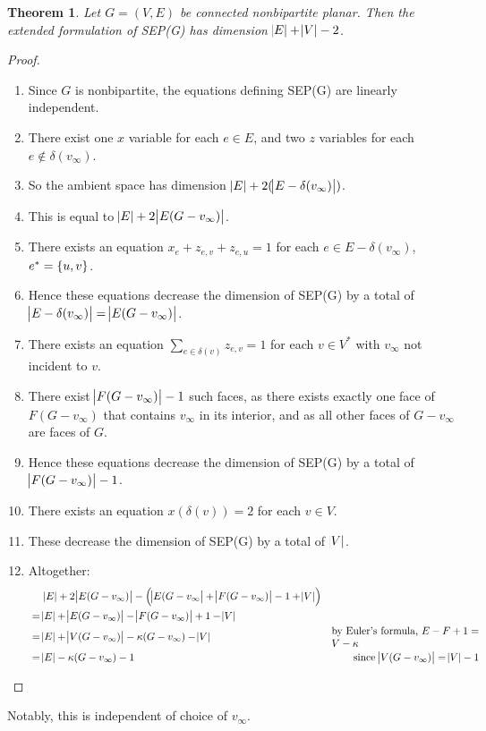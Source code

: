 \documentclass{article}
\newtheorem{theorem}{Theorem}
\begin{document}
\begin{theorem}
Let $G=(V,E)$ be connected nonbipartite planar. Then the extended formulation of SEP(G) has dimension $\abs{E}+\abs{V}-2$.
\end{theorem}
\begin{proof}
\begin{enumerate}
\item Since $G$ is nonbipartite, the equations defining SEP(G) are linearly independent.
\item There exist one $x$ variable for each $e\in E$, and two $z$ variables for each $e\not\in \delta(v_\infty)$.
\item So the ambient space has dimension $\abs{E}+2(\abs{E-\delta(v_\infty)})$.
\item This is equal to $\abs{E}+2\abs{E(G-v_\infty)}$.
\item There exists an equation $x_e+z_{e,v}+z_{e,u}=1$ for each $e\in E-\delta(v_\infty)$, $e^* = \cbr{u,v}$.
\item Hence these equations decrease the dimension of SEP(G) by a total of $\abs{E-\delta(v_\infty)} = \abs{E(G-v_\infty)}$.
\item There exists an equation $\sum_{e\in\delta(v)} z_{e,v}=1$ for each $v\in V^*$ with $v_\infty$ not incident to $v$.
\item There exist $\abs{F(G-v_\infty)} - 1$ such faces, as there exists exactly one face of $F(G-v_\infty)$ that contains $v_\infty$ in its interior, and as all other faces of $G-v_\infty$ are faces of $G$.
\item Hence these equations decrease the dimension of SEP(G) by a total of $\abs{F(G-v_\infty)} - 1$.
\item There exists an equation $x(\delta(v)) = 2$ for each $v\in V$.
\item These decrease the dimension of SEP(G) by a total of $\abs{V}$.
\item Altogether: 
\begin{align*}
&\phantom{{}={}}  \abs{E}+2\abs{E(G-v_\infty)} - \del{\abs{E(G-v_\infty} + \abs{F(G-v_\infty)} - 1 + \abs{V}} \\
&= \abs{E} + \abs{E(G-v_\infty)} - \abs{F(G-v_\infty)} + 1 - \abs{V} \\
&= \abs{E} + \abs{V(G-v_\infty)} - \kappa(G-v_\infty) - \abs{V}  & \parbox{5cm}{by Euler's formula, $E-F+1=V-\kappa$} \\
&= \abs{E} - \kappa(G-v_\infty) - 1 & \text{since $\abs{V(G-v_\infty)} = \abs{V}-1$}
\end{align*}

\end{enumerate}
\end{proof}

Notably, this is independent of choice of $v_\infty$.
\end{document}
